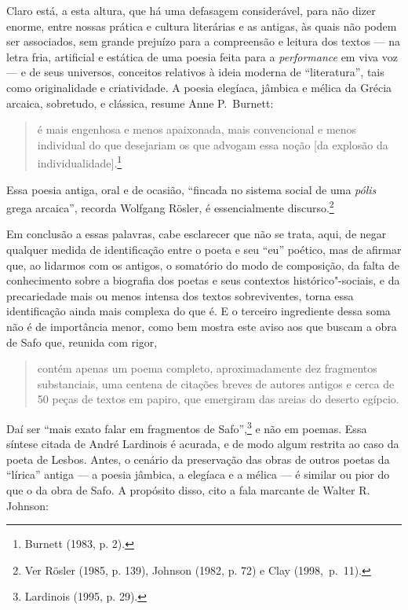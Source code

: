 Claro está, a esta altura, que há uma defasagem considerável, para não dizer
enorme, entre nossas prática e cultura literárias e as antigas, às quais não
podem ser associados, sem grande prejuízo para a compreensão e leitura dos
textos --- na letra fria, artificial e estática de uma poesia feita para a
\textit{performance} em viva voz --- e de seus universos, conceitos relativos à
ideia moderna de “literatura”, tais como originalidade e criatividade. A poesia
elegíaca, jâmbica e mélica da Grécia arcaica, sobretudo, e clássica, resume
Anne P.~Burnett: 

\begin{quote}
é mais engenhosa e menos apaixonada,
mais convencional e menos individual do que desejariam os que advogam essa noção [da
explosão da individualidade].\footnote{ Burnett (1983, p. 2).} 
\end{quote}

Essa poesia antiga, oral e de
ocasião, “fincada no sistema social de uma \textit{pólis} grega arcaica”,
recorda Wolfgang Rösler, é essencialmente discurso.\footnote{ Ver
Rösler (1985, p. 139), Johnson (1982, p. 72) e Clay \mbox{(1998, p. 11)}.}

Em conclusão a essas palavras, cabe esclarecer que não se trata, aqui, de negar
qualquer medida de identificação entre o poeta e seu “eu” poético, mas de
afirmar que, ao lidarmos com os antigos, o somatório do modo de composição, da
falta de conhecimento sobre a biografia dos poetas e seus contextos
histórico"-sociais, e da precariedade mais ou menos intensa dos textos
sobreviventes, torna essa identificação ainda mais complexa do que é.
E o terceiro ingrediente dessa soma não é de importância menor, como
bem mostra este aviso aos que buscam a obra de Safo que, reunida com rigor,

\begin{quote}
contém apenas um poema completo, aproximadamente dez fragmentos substanciais,
uma centena de citações breves de autores antigos e cerca de 50 peças de textos
em papiro, que emergiram das areias do deserto egípcio.
\end{quote}

Daí ser “mais exato
falar em fragmentos de Safo”,\footnote{ Lardinois (1995, p. 29).} e não em
poemas. Essa síntese citada de André Lardinois é acurada, e de modo algum restrita ao
caso da poeta de Lesbos.
Antes, o cenário da preservação das obras de outros poetas da “lírica” antiga ---
a poesia jâmbica, a elegíaca e a mélica --- é similar ou pior do que
o da obra de Safo. A propósito disso, cito a fala marcante de Walter R. Johnson:

